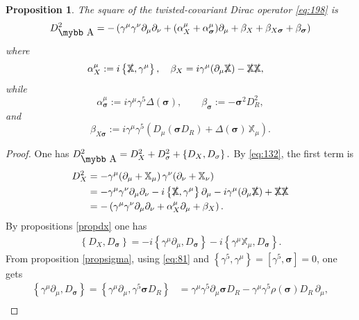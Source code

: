 \documentclass[11pt]{article}
\newcommand{\sig}{{\boldsymbol{\sigma}}}
\newcommand{\XX}{{\mathbb X}}
\def\bb#1{\hbox{\mybb#1}}
\newcommand{\del}{\partial}
\newtheorem{prop}{Proposition}[section]
\begin{document}
\begin{prop} The square of the twisted-covariant Dirac operator
\eqref{eq:198} is
  \begin{equation}
    \label{eq:47}
    D_{\bb A}^2 = -\left(\gamma^\mu\gamma^\nu\del_\mu\del_\nu + (\alpha_X^\mu+\alpha^\mu_{\sig}) \del_\mu
+\beta_X +\beta_{X\sig}+ \beta_{\sig}\right)
  \end{equation}
where
 \begin{eqnarray}\label{eq:alpha}
\alpha^{\mu}_X & := i\left\{\slashed{\mathbb X}, \gamma^\mu\right\} ,
\quad 
\beta_X = i\gamma^\mu (\del_\mu\slashed{\mathbb X}) -  \slashed{\mathbb X}\slashed{\mathbb X},
\end{eqnarray} 
while
\begin{equation}
  \label{eq:48}
\alpha^\mu_{\sig}:=  i
   \gamma^{\mu}\gamma^{5} \Delta(\sig),\quad\quad   \beta_{\sig} := -\sig^2 D_R^2,
\end{equation}
and
\begin{equation}
  \label{eq:153}
\beta_{X\sig}:= i\gamma^\mu\gamma^5\left(D_\mu (\sig D_R) + \Delta(\sig)\,\XX_\mu\right).
\end{equation}
\end{prop}\begin{proof}
One has
$  D_{\bb A}^2 =D_X^2 + D_\sigma^2 +  \left\{D_X, D_\sigma\right\}.$
 By \eqref{eq:132}, the first term is
\begin{align}
D_X^{2}&=-\gamma^\mu(\del_\mu + \XX_\mu)\, \gamma^\nu(\del_\nu + \XX_\nu) \\
 &= -\gamma^\mu\gamma^\nu \del_\mu\del_\nu -i\left\{\slashed
   \XX,\gamma^\mu\right\}\del_\mu -i \gamma^\mu (\del_\mu \slashed\XX)
 +\slashed \XX\slashed \XX\\
&= -\left(\gamma^\mu\gamma^\nu\del_\mu\del_\nu
   +\alpha^{\mu}_X\partial_{\mu}+\beta_X\right).
\label{eq:161}
\end{align}
By propositions \ref{propdx} one has
\begin{align}
  \label{eq:193}
  \left\{D_X, D_\sig\right\} = -i\left\{\gamma^\mu \del_\mu,
    D_\sig\right\} -i \left\{\gamma^\mu \XX_\mu,
    D_\sig\right\}. 
\end{align}
From proposition \ref{propsigma}, using \eqref{eq:81} and $\left\{\gamma^5,
  \gamma^\mu\right\} = [\gamma^5, \sig] = 0$, one gets
\begin{align}
  \label{eq:194}
  \left\{\gamma^\mu \del_\mu, D_\sig\right\} =   \left\{\gamma^\mu\del_\mu, \gamma^5\sig D_R\right\}
&=\gamma^\mu\gamma^5 \del_\mu \sig  D_R  - \gamma^\mu\gamma^5\rho(\sig) D_R \,\del_\mu,\\

\end{align}
\end{proof}
\end{document}
